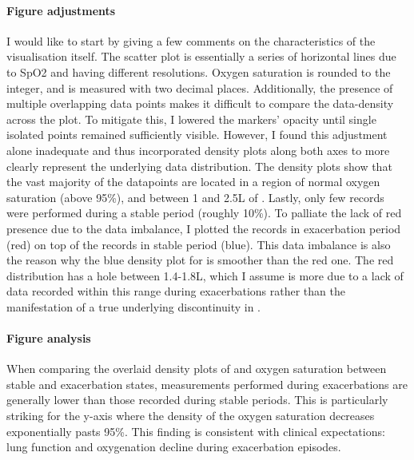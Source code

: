 \paragraph{Figure adjustments}
I would like to start by giving a few comments on the characteristics of the visualisation itself. The scatter plot is essentially a series of horizontal lines due to SpO2 and \F having different resolutions. Oxygen saturation is rounded to the integer, and \F is measured with two decimal places. Additionally, the presence of multiple overlapping data points makes it difficult to compare the data-density across the plot. To mitigate this, I lowered the markers’ opacity until single isolated points remained sufficiently visible. However, I found this adjustment alone inadequate and thus incorporated density plots along both axes to more clearly represent the underlying data distribution. The density plots show that the vast majority of the datapoints are located in a region of normal oxygen saturation (above 95\%), and between 1 and 2.5L of \F. Lastly, only few records were performed during a stable period (roughly 10\%). To palliate the lack of red presence due to the data imbalance, I plotted the records in exacerbation period (red) on top of the records in stable period (blue). This data imbalance is also the reason why the blue density plot for \F is smoother than the red one. The red distribution has a hole between 1.4-1.8L, which I assume is more due to a lack of data recorded within this range during exacerbations rather than the manifestation of a true underlying discontinuity in \F.

\paragraph{Figure analysis}
When comparing the overlaid density plots of \F and oxygen saturation between stable and exacerbation states, measurements performed during exacerbations are generally lower than those recorded during stable periods. This is particularly striking for the y-axis where the density of the oxygen saturation decreases exponentially pasts 95\%. This finding is consistent with clinical expectations: lung function and oxygenation decline during exacerbation episodes.

